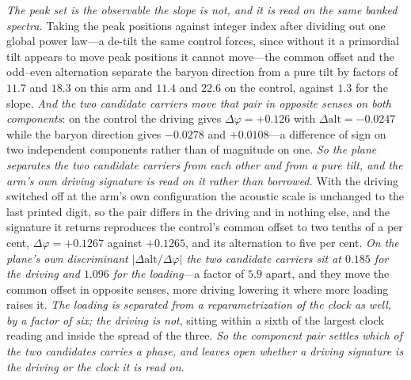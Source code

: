\documentclass[11pt,a4paper]{article}
\theoremstyle{plain}
\theoremstyle{definition}
\theoremstyle{remark}
\begin{document}
\emph{The peak set is the observable the slope is not, and it is read on the same banked spectra.}
Taking the peak positions against integer index after dividing out one global power law---a de-tilt
the same control forces, since without it a primordial tilt appears to move peak positions it cannot
move---the common offset and the odd--even alternation separate the baryon direction from a pure tilt
by factors of $11.7$ and $18.3$ on this arm and $11.4$ and $22.6$ on the control, against $1.3$ for
the slope. \emph{And the two candidate carriers move that pair in opposite senses on both
components}: on the control the driving gives $\Delta\varphi=+0.126$ with
$\Delta\mathrm{alt}=-0.0247$ while the baryon direction gives $-0.0278$ and $+0.0108$---a difference
of sign on two independent components rather than of magnitude on one. \emph{So the plane separates the two candidate carriers from each other and from a pure tilt, and
the arm's own driving signature is read on it rather than borrowed.} With the driving switched
off at the arm's own configuration the acoustic scale is unchanged to the last printed digit, so the
pair differs in the driving and in nothing else, and the signature it returns reproduces the
control's common offset to two tenths of a per cent, $\Delta\varphi=+0.1267$ against $+0.1265$, and its alternation to five per cent. \emph{On the plane's own
discriminant $\lvert\Delta\mathrm{alt}/\Delta\varphi\rvert$ the two candidate carriers sit at
$0.185$ for the driving and $1.096$ for the loading}---a factor of $5.9$ apart, and they move the
common offset in opposite senses, more driving lowering it where more loading raises it. \emph{The
loading is separated from a reparametrization of the clock as well, by a factor of six; the driving
is not}, sitting within a sixth of the largest clock reading and inside the spread of the three.
\emph{So the component pair settles which of the two candidates carries a phase, and leaves open
whether a driving signature is the driving or the clock it is read on}.
\end{document}
